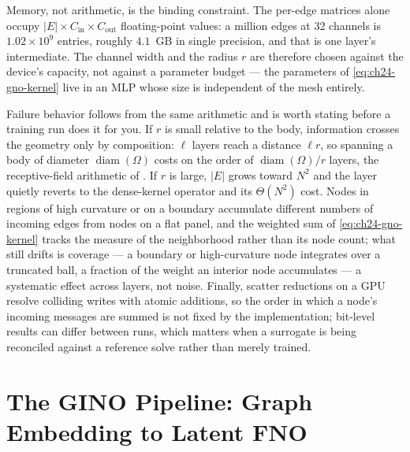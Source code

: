 Memory, not arithmetic, is the binding constraint. The per-edge matrices alone occupy $|E|
\times C_{\text{in}} \times C_{\text{out}}$ floating-point values: a million edges at 32
channels is $1.02 \times 10^{9}$ entries, roughly $4.1$~GB in single precision, and that is
one layer's intermediate. The channel width and the radius $r$ are therefore chosen against
the device's capacity, not against a parameter budget --- the parameters of
\eqref{eq:ch24-gno-kernel} live in an MLP whose size is independent of the mesh entirely.

Failure behavior follows from the same arithmetic and is worth stating before a training run
does it for you. If $r$ is small relative to the body, information crosses the geometry only
by composition: $\ell$ layers reach a distance $\ell r$, so spanning a body of diameter
$\operatorname{diam}(\Omega)$ costs on the order of $\operatorname{diam}(\Omega)/r$ layers,
the receptive-field arithmetic of
. If $r$ is large, $|E|$ grows toward
$N^{2}$ and the layer quietly reverts to the dense-kernel operator and its $\Theta(N^{2})$
cost. Nodes in regions of high curvature or on a boundary accumulate different numbers of
incoming edges from nodes on a flat panel, and the weighted sum of \eqref{eq:ch24-gno-kernel}
tracks the measure of the neighborhood rather than its node count; what still drifts is
coverage --- a boundary or high-curvature node integrates over a truncated ball, a
fraction of the weight an interior node accumulates --- a systematic effect across layers,
not noise. Finally, scatter reductions on a GPU resolve colliding writes with atomic
additions, so the order in which a node's incoming messages are summed is not fixed by the
implementation; bit-level results can differ between runs, which matters when a surrogate is
being reconciled against a reference solve rather than merely trained.

\section{The GINO Pipeline: Graph Embedding to Latent FNO}
\label{sec:ch24-gino}

